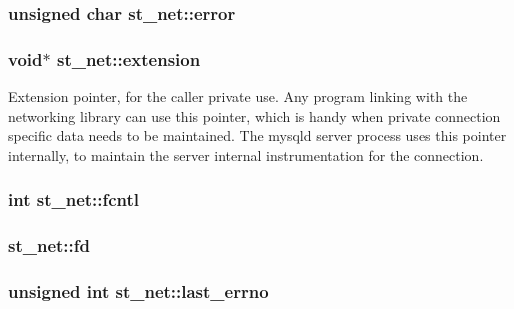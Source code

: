 \subsubsection[{error}]{\setlength{\rightskip}{0pt plus 5cm}unsigned char st\+\_\+net\+::error}\label{structst__net_af25692866530d247001f5c189ffca8f6}
\hypertarget{structst__net_a7b50c3d075f87f4e51a1726a7d714869}{}
\subsubsection[{extension}]{\setlength{\rightskip}{0pt plus 5cm}void$\ast$ st\+\_\+net\+::extension}\label{structst__net_a7b50c3d075f87f4e51a1726a7d714869}
Extension pointer, for the caller private use. Any program linking with the networking library can use this pointer, which is handy when private connection specific data needs to be maintained. The mysqld server process uses this pointer internally, to maintain the server internal instrumentation for the connection. \hypertarget{structst__net_af0e9b81f66c42f6bb55d53608a24d894}{}
\subsubsection[{fcntl}]{\setlength{\rightskip}{0pt plus 5cm}int st\+\_\+net\+::fcntl}\label{structst__net_af0e9b81f66c42f6bb55d53608a24d894}
\hypertarget{structst__net_aec6de4e9b1fccc6ae611ef83cf06e689}{}
\subsubsection[{fd}]{ st\+\_\+net\+::fd}\label{structst__net_aec6de4e9b1fccc6ae611ef83cf06e689}
\hypertarget{structst__net_ad32d83e52fbb9bde714a4e91ddd4cca7}{}
\subsubsection[{last\+\_\+errno}]{\setlength{\rightskip}{0pt plus 5cm}unsigned int st\+\_\+net\+::last\+\_\+errno}\label{structst__net_ad32d83e52fbb9bde714a4e91ddd4cca7}
\hypertarget{structst__net_a076ac7884d3874905c0c95b6518228fc}{}
